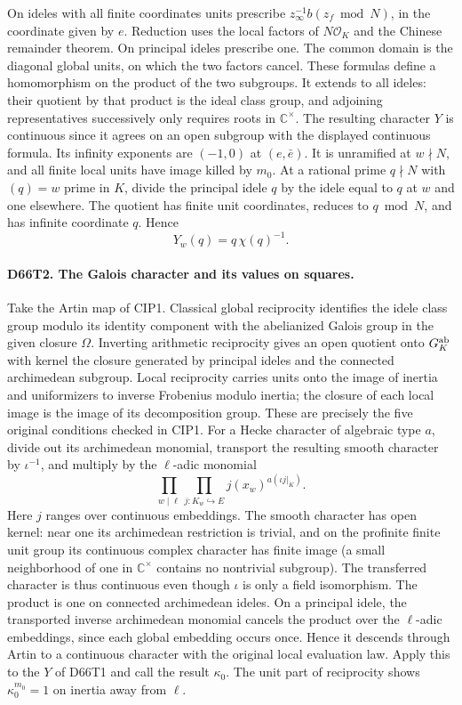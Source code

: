 On ideles with all finite coordinates units prescribe
$z_\infty^{-1}b(z_f\bmod N)$, in the coordinate given by $e$.
Reduction uses the local factors of $N\mathcal O_K$ and the Chinese
remainder theorem. On principal ideles prescribe one. The common
domain is the diagonal global units, on which the two factors cancel.
These formulas define a homomorphism on the product of the two
subgroups. It extends to all ideles: their quotient by that product
is the ideal class group, and adjoining representatives successively
only requires roots in $\mathbb C^\times$. The resulting character
$Y$ is continuous since it agrees on an open subgroup with the
displayed continuous formula. Its infinity exponents are $(-1,0)$
at $(e,\bar e)$. It is unramified at $w\nmid N$, and all finite local
units have image killed by $m_0$. At a rational prime $q\nmid N$
with $(q)=w$ prime in $K$, divide the principal idele $q$ by the
idele equal to $q$ at $w$ and one elsewhere. The quotient has finite
unit coordinates, reduces to $q\bmod N$, and has infinite coordinate
$q$. Hence
\[
                       Y_w(q)=q\,\chi(q)^{-1}.
\]

\paragraph{D66T2. The Galois character and its values on squares.}
Take the Artin map of CIP1. Classical global reciprocity identifies
the idele class group modulo its identity component with the
abelianized Galois group in the given closure $\Omega$. Inverting
arithmetic reciprocity gives an open quotient onto $G_K^{\rm ab}$
with kernel the closure generated by principal ideles and the
connected archimedean subgroup. Local reciprocity carries units
onto the image of inertia and uniformizers to inverse Frobenius
modulo inertia; the closure of each local image is the image of
its decomposition group. These are precisely the five original
conditions checked in CIP1. For a Hecke character of
algebraic type $a$, divide out its archimedean monomial, transport
the resulting smooth character by $\iota^{-1}$, and multiply by
the $\ell$-adic monomial
\[
             \prod_{w\mid\ell}\prod_{j:K_w\hookrightarrow E}
                 j(x_w)^{a(\iota j|_K)} .
\]
Here $j$ ranges over continuous embeddings. The smooth character
has open kernel: near one its archimedean restriction is trivial,
and on the profinite finite unit group its continuous complex
character has finite image (a small neighborhood of one in
$\mathbb C^\times$ contains no nontrivial subgroup).
The transferred character is thus continuous even though
$\iota$ is only a field isomorphism. The product is one on connected
archimedean ideles. On a principal idele, the transported inverse
archimedean monomial cancels the product over the $\ell$-adic
embeddings, since each global embedding occurs once. Hence it
descends through Artin to a continuous character with the original
local evaluation law. Apply this to the $Y$ of D66T1 and call the
result $\kappa_0$. The unit part of reciprocity shows
$\kappa_0^{m_0}=1$ on inertia away from $\ell$.

